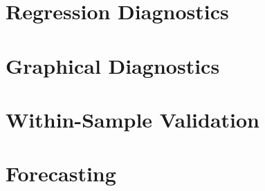 \documentclass[
  11,
]{book}
\begin{document}
\hypertarget{regression-diagnostics}{%
\section*{Regression Diagnostics}\label{regression-diagnostics}}


\hypertarget{graphical-diagnostics}{%
\section*{Graphical Diagnostics}\label{graphical-diagnostics}}


\hypertarget{within-sample-validation}{%
\section*{Within-Sample Validation}\label{within-sample-validation}}


\hypertarget{forecasting}{%
\section*{Forecasting}\label{forecasting}}
\end{document}
